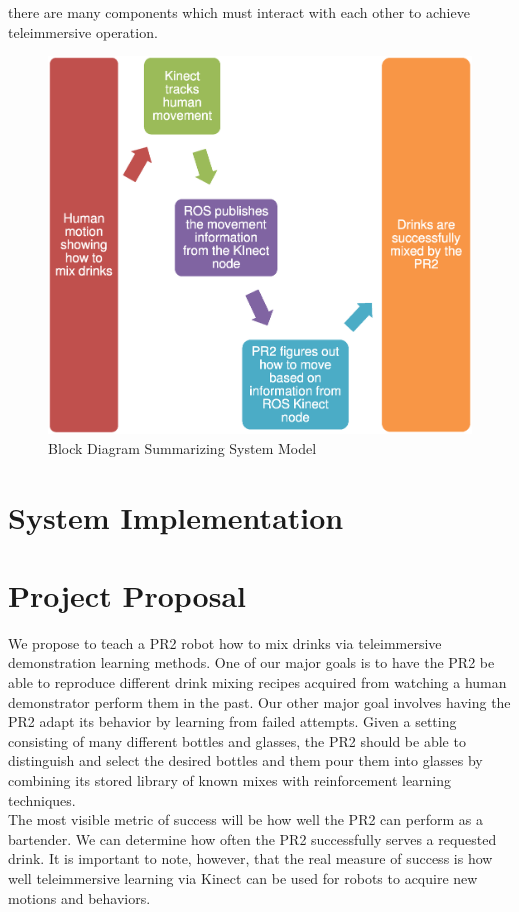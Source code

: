 \documentclass{sig-alternate}
\begin{document}
 there are many components
which must interact with each other to achieve teleimmersive operation.
\begin{figure}[htb] 
	\begin{center}
		\includegraphics[width=1.0\linewidth]{flowchart}
	\end{center}
	\caption{Block Diagram Summarizing System Model}
	\label{fig:some_graph}
\end{figure}
\section{System Implementation}

\section{Project Proposal}

\label{sec:project_proposal}We propose to teach a PR2 robot how to mix drinks via
teleimmersive demonstration learning methods. One of our major goals is to have the PR2
be able to reproduce different drink mixing recipes acquired from watching
a human demonstrator perform them in the past.
Our other major goal involves having the PR2 adapt its behavior by learning from failed attempts.
Given a setting consisting of many different bottles and glasses, the PR2 should be able to 
distinguish and select the desired bottles and them pour them into glasses by
combining its stored library of known mixes with reinforcement learning techniques.\\
The most visible metric of success will be  how well the PR2
can perform as a bartender. We can determine how often the PR2
successfully serves a requested drink. It is important to note, however, that the real
measure of success is how well teleimmersive learning via Kinect can be used
for robots to acquire new motions and behaviors.
\end{document}
